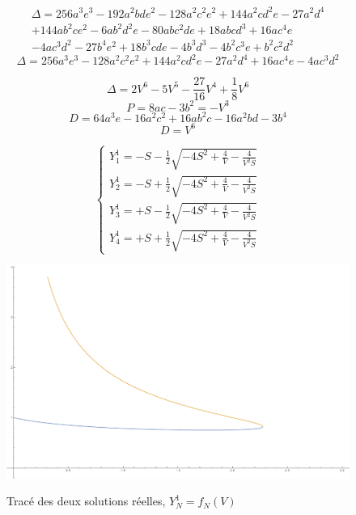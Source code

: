 \documentclass{beamer}
\begin{document}
\begin{frame}
\begin{align*}
\label{Delta}
 \Delta = 256a^3 e^3 - 192 a^2bde^2 - 128 a^2 c^2 e^2 + 144a^2cd^2e - 27a^2d^4\\ 
 + 144 ab^2ce^2 - 6ab^2d^2e - 80abc^2de + 18abcd^3 + 16ac^4e\\
 -4ac^3d^2-27b^4e^2+18b^3cde - 4b^3d^3 - 4b^2c^3e+b^2c^2d^2
 \end{align*}
\begin{equation}
 \Delta = 256a^3 e^3 - 128 a^2 c^2 e^2 + 144a^2cd^2e - 27a^2d^4 + 16ac^4e -4ac^3d^2
\end{equation}

\begin{equation}
 \Delta = 2V^6 - 5V^5 - \frac{27}{16} V^4 + \frac{1}{8}V^6
\end{equation}
\begin{equation}
\label{P}
 P = 8ac - 3b^2 = -V^3
\end{equation}
\begin{equation}
 D = 64a^3e -16a^2c^2 + 16ab^2c - 16a^2bd -3b^4
\end{equation}
\begin{equation}
\label{D}
 D = V^6
\end{equation}
\end{frame}
\begin{frame}
\begin{equation}
\left\{ \begin{array}{rl}
Y^1_{1} = - S - \frac{1}{2}\sqrt{-4S^2+\frac{4}{V}-\frac{4}{V^2 S}}\\
Y^1_{2} = - S + \frac{1}{2}\sqrt{-4S^2+\frac{4}{V}-\frac{4}{V^2 S}}\\
Y^1_{3} = + S - \frac{1}{2}\sqrt{-4S^2+\frac{4}{V}-\frac{4}{V^2 S}}\\
Y^1_{4} = + S + \frac{1}{2}\sqrt{-4S^2+\frac{4}{V}-\frac{4}{V^2 S}}
\end{array} \right.
\end{equation} 
\end{frame}


\begin{frame}
 \begin{figure}
\caption{Trac\'e des deux solutions r\'eelles, $Y^1_N = f_N(V)$}
\includegraphics[width = \textwidth]{Courbes2.png}
\label{solb}
\end{figure}

\end{frame}
\end{document}
